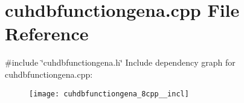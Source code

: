 \section{cuhdbfunctiongena.\+cpp File Reference}
\label{cuhdbfunctiongena_8cpp}
{\ttfamily \#include \char`\"{}cuhdbfunctiongena.\+h\char`\"{}}\newline
Include dependency graph for cuhdbfunctiongena.\+cpp\+:
\nopagebreak
\begin{figure}[H]
\begin{center}
\leavevmode
\texttt{[image: cuhdbfunctiongena\_8cpp\_\_incl]}
\end{center}
\end{figure}
